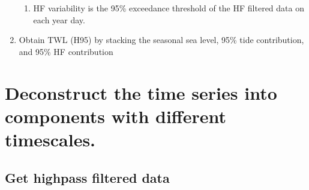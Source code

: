 \documentclass[letterpaper,10pt,english]{jupyterBook}
\begin{document}
\begin{enumerate}
\begin{enumerate}
\item {} 
\sphinxAtStartPar
HF variability is the 95\% exceedance threshold of the HF filtered data on each year day.

\end{enumerate}

\item {} 
\sphinxAtStartPar
Obtain TWL (H95) by stacking the seasonal sea level, 95\% tide contribution, and 95\% HF contribution

\end{enumerate}


\part{Deconstruct the time series into components with different timescales.}
\label{\detokenize{notebooks/regional_and_local/SL_Components_intra-annual:deconstruct-the-time-series-into-components-with-different-timescales}}

\chapter{Get high\sphinxhyphen{}pass filtered data}
\label{\detokenize{notebooks/regional_and_local/SL_Components_intra-annual:get-high-pass-filtered-data}}
\end{document}
